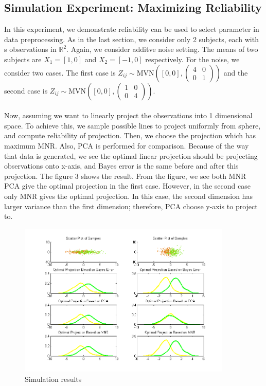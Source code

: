 \documentclass[11pt,journal,compsoc]{IEEEtran}
\begin{document}
\subsection{Simulation Experiment: Maximizing Reliability}
\noindent In this experiment, we demonstrate reliability can be used to select parameter in data preprocessing. As in the last section, we consider only 2 subjects, each with s observations in $\mathbb{R}^2$. Again, we consider additve noise setting. The means of two subjects are $X_1=[1,0]$ and $X_2=[-1,0]$ respectively. For the noise, we consider two cases. The first case is $Z_{ij}\sim\text{MVN}([0,0],(\begin{matrix} 4 & 0 \\ 0 & 1\end{matrix}))$ and the second case is $Z_{ij}\sim\text{MVN}([0,0],(\begin{matrix} 1 & 0 \\ 0 & 4\end{matrix}))$. \\
\\
Now, assuming we want to linearly project the observations into 1 dimensional space. To achieve this, we sample possible lines to project uniformly from sphere, and compute reliability of projection. Then, we choose the projection which has maximum MNR. Also, PCA is performed for comparison. Because of the way that data is generated, we see the optimal linear projection should be projecting observations onto x-axis, and Bayes error is the same before and after this projection. The figure 3 shows the result. From the figure, we see both MNR PCA give the optimal projection in the first case. However, in the second case only MNR gives the optimal projection. In this case, the second dimension has larger variance than the first dimension; therefore, PCA choose y-axis to project to.

\begin{figure}[t!]
\begin{center}
\includegraphics[width=4in]{parameter_selection_2sub}
\end{center}
\caption{Simulation results}
\end{figure}
\end{document}
